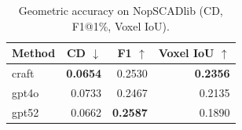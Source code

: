 \begin{table}[t]
\centering
\caption{Geometric accuracy on NopSCADlib (CD, F1@1\%, Voxel IoU).}
\label{tab:geometric_nopscadlib}
\begin{tabular}{lrrr}
\toprule
Method & CD $\downarrow$ & F1 $\uparrow$ & Voxel IoU $\uparrow$ \\
\midrule
craft & \textbf{0.0654} & 0.2530 & \textbf{0.2356} \\
gpt4o & 0.0733 & 0.2467 & 0.2135 \\
gpt52 & 0.0662 & \textbf{0.2587} & 0.1890 \\
\bottomrule
\end{tabular}
\end{table}
